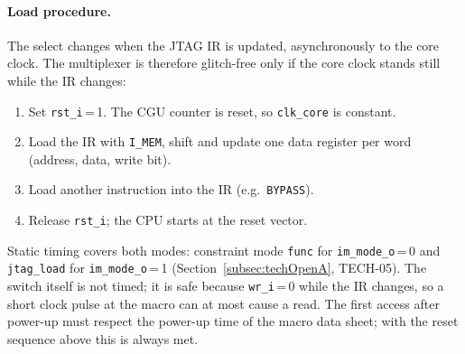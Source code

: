 \paragraph{Load procedure.}
The select changes when the JTAG IR is updated, asynchronously to the core
clock. The multiplexer is therefore glitch-free only if the core clock stands
still while the IR changes:
\begin{enumerate}
  \item Set \texttt{rst\_i}\,=\,1. The CGU counter is reset, so
    \texttt{clk\_core} is constant.
  \item Load the IR with \texttt{I\_MEM}, shift and update one data register
    per word (address, data, write bit).
  \item Load another instruction into the IR (e.g.\ \texttt{BYPASS}).
  \item Release \texttt{rst\_i}; the CPU starts at the reset vector.
\end{enumerate}
Static timing covers both modes: constraint mode \texttt{func} for
\texttt{im\_mode\_o}\,=\,0 and \texttt{jtag\_load} for
\texttt{im\_mode\_o}\,=\,1 (Section~\ref{subsec:techOpenA}, TECH-05). The
switch itself is not timed; it is safe because \texttt{wr\_i}\,=\,0 while
the IR changes, so a short clock pulse at the macro can at most cause a read.
The first access after power-up must respect the power-up time of the macro
data sheet; with the reset sequence above this is always met.
